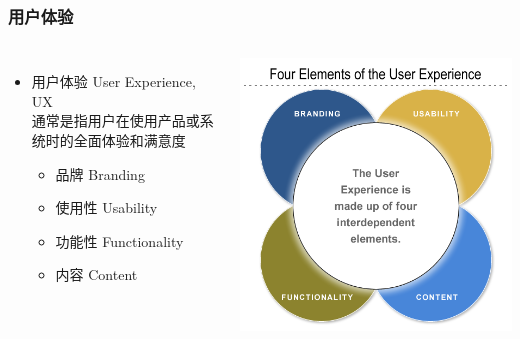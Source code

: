 \documentclass{beamer}
\begin{document}

\begin{frame}
	\frametitle{用户体验}
	\beamertemplatetransparentcovereddynamicmedium
	\begin{columns}
	\begin{itemize}[<+->]
		\item 用户体验 User Experience, UX\\{\tiny 通常是指用户在使用产品或系统时的全面体验和满意度~\cite{dis20109241}}
		\begin{itemize}
			\item 品牌 Branding
			\item 使用性 Usability
			\item 功能性 Functionality
			\item 内容 Content
		\end{itemize}
	\end{itemize}
	\includegraphics[width=\textwidth]{images/user-experience.png}
	\end{columns}
\end{frame}
\end{document}
